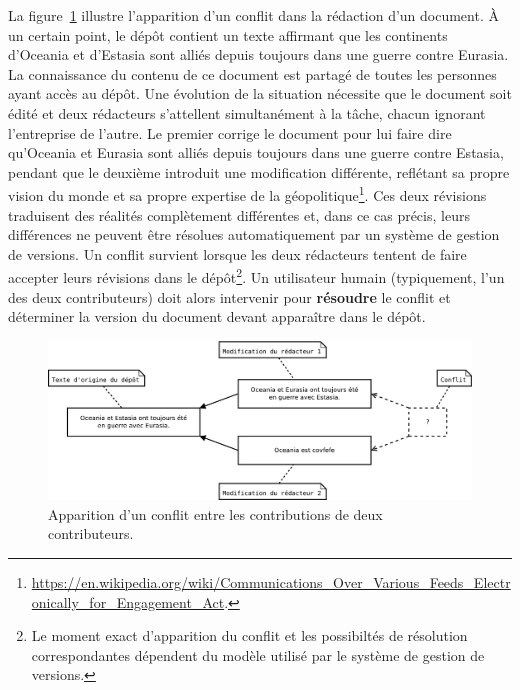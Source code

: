 La figure~\ref{fig:conflit} illustre l'apparition d'un conflit dans la
rédaction d'un document. À un certain point, le dépôt contient un
texte affirmant que les continents d'Oceania et d'Estasia sont alliés
depuis toujours dans une guerre contre Eurasia. La connaissance du
contenu de ce document est partagé de toutes les personnes ayant accès
au dépôt. Une évolution de la situation nécessite que le document soit
édité et deux rédacteurs s'attellent simultanément à la tâche, chacun
ignorant l'entreprise de l'autre. Le premier corrige le document pour
lui faire dire qu'Oceania et Eurasia sont alliés depuis toujours dans
une guerre contre Estasia, pendant que le deuxième introduit une
modification différente, reflétant sa propre vision du monde et sa
propre expertise de la
géopolitique\footnote{\url{https://en.wikipedia.org/wiki/Communications_Over_Various_Feeds_Electronically_for_Engagement_Act}.}. Ces
deux révisions traduisent des réalités complètement différentes et,
dans ce cas précis, leurs différences ne peuvent être résolues
automatiquement par un système de gestion de versions. Un conflit
survient lorsque les deux rédacteurs tentent de faire accepter leurs
révisions dans le dépôt\footnote{Le moment exact d'apparition du
  conflit et les possibiltés de résolution correspondantes dépendent
  du modèle utilisé par le système de gestion de versions.}. Un
utilisateur humain (typiquement, l'un des deux contributeurs) doit
alors intervenir pour
\textbf{résoudre} le conflit et
déterminer la version du document devant apparaître dans le dépôt.

\begin{figure}[h!]
  \includegraphics[width=15cm]{figures/conflit}
  \caption{Apparition d'un conflit entre les contributions de deux
    contributeurs.\label{fig:conflit}}
\end{figure}

